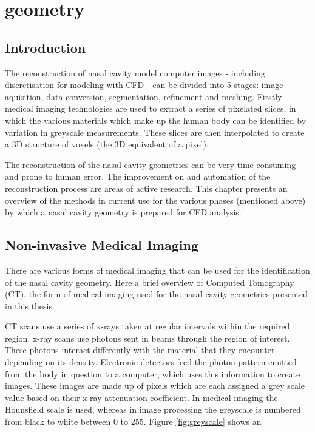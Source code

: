 \section{geometry}
\subsection{Introduction}

The reconstruction of nasal cavity model computer images - including discretisation for modeling with CFD - can be divided into 5 stages: image aquisition, data conversion, segmentation, refinement and meshing. Firstly medical imaging technologies are used to extract a series of pixelated slices, in which the various materials which make up the human body can be identified by variation in greyscale measurements. These slices are then interpolated to create a 3D structure of voxels (the 3D equivalent of a pixel).

The reconstruction of the nasal cavity geometries can be very time consuming and prone to human error. The improvement on and automation of the reconstruction process are areas of active research. This chapter presents an overview of the methods in current use for the various phases (mentioned above) by which a nasal cavity geometry is prepared for CFD analysis.

\subsection{Non-invasive Medical Imaging}

There are various forms of medical imaging that can be used for the identification of the nasal cavity geometry. Here a brief overview of Computed Tomography (CT), the form of medical imaging used for the nasal cavity geometries presented in this thesis.

CT scans use a series of x-rays taken at regular intervals within the required region. x-ray scans use photons sent in beams through the region of interest. These photons interact differently with the material that they encounter depending on its density. Electronic detectors feed the photon pattern emitted from the body in question to a computer, which uses this information to create images. These images are made up of pixels which are each assigned a grey scale value based on their x-ray attenuation coefficient. In medical imaging the Hounsfield scale is used, whereas in image processing the greyscale is numbered from black to white between 0 to 255. Figure \ref{fig:greyscale} shows an  


